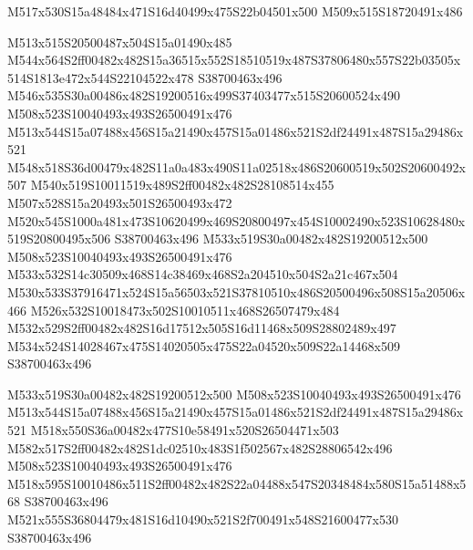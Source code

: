 \documentclass{article}
\begin{document}
\begin{multicols}{2}
\begin{center}
M517x530S15a48484x471S16d40499x475S22b04501x500 M509x515S18720491x486 
\end{center}


M513x515S20500487x504S15a01490x485 M544x564S2ff00482x482S15a36515x552S18510519x487S37806480x557S22b03505x514S1813e472x544S22104522x478 S38700463x496 M546x535S30a00486x482S19200516x499S37403477x515S20600524x490 M508x523S10040493x493S26500491x476 M513x544S15a07488x456S15a21490x457S15a01486x521S2df24491x487S15a29486x521 M548x518S36d00479x482S11a0a483x490S11a02518x486S20600519x502S20600492x507 M540x519S10011519x489S2ff00482x482S28108514x455 M507x528S15a20493x501S26500493x472 M520x545S1000a481x473S10620499x469S20800497x454S10002490x523S10628480x519S20800495x506 S38700463x496 M533x519S30a00482x482S19200512x500 M508x523S10040493x493S26500491x476 M533x532S14c30509x468S14c38469x468S2a204510x504S2a21c467x504 M530x533S37916471x524S15a56503x521S37810510x486S20500496x508S15a20506x466 M526x532S10018473x502S10010511x468S26507479x484 M532x529S2ff00482x482S16d17512x505S16d11468x509S28802489x497 M534x524S14028467x475S14020505x475S22a04520x509S22a14468x509 S38700463x496

M533x519S30a00482x482S19200512x500 M508x523S10040493x493S26500491x476 M513x544S15a07488x456S15a21490x457S15a01486x521S2df24491x487S15a29486x521 M518x550S36a00482x477S10e58491x520S26504471x503 M582x517S2ff00482x482S1dc02510x483S1f502567x482S28806542x496 M508x523S10040493x493S26500491x476 M518x595S10010486x511S2ff00482x482S22a04488x547S20348484x580S15a51488x568 S38700463x496 M521x555S36804479x481S16d10490x521S2f700491x548S21600477x530 S38700463x496


\end{multicols}
\end{document}
